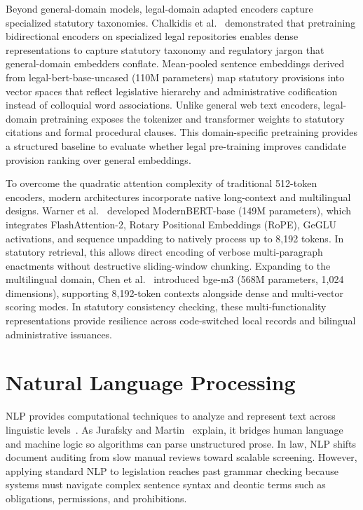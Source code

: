     Beyond general-domain models, legal-domain adapted encoders capture specialized statutory taxonomies. Chalkidis et al.~\cite{chalkidis2020legal} demonstrated that pretraining bidirectional encoders on specialized legal repositories enables dense representations to capture statutory taxonomy and regulatory jargon that general-domain embedders conflate. Mean-pooled sentence embeddings derived from legal-bert-base-uncased (110M parameters) map statutory provisions into vector spaces that reflect legislative hierarchy and administrative codification instead of colloquial word associations. Unlike general web text encoders, legal-domain pretraining exposes the tokenizer and transformer weights to statutory citations and formal procedural clauses. This domain-specific pretraining provides a structured baseline to evaluate whether legal pre-training improves candidate provision ranking over general embeddings.

    To overcome the quadratic attention complexity of traditional 512-token encoders, modern architectures incorporate native long-context and multilingual designs. Warner et al.~\cite{warner2024modernbert} developed ModernBERT-base (149M parameters), which integrates FlashAttention-2, Rotary Positional Embeddings (RoPE), GeGLU activations, and sequence unpadding to natively process up to 8,192 tokens. In statutory retrieval, this allows direct encoding of verbose multi-paragraph enactments without destructive sliding-window chunking. Expanding to the multilingual domain, Chen et al.~\cite{chen2024bgem3} introduced bge-m3 (568M parameters, 1,024 dimensions), supporting 8,192-token contexts alongside dense and multi-vector scoring modes. In statutory consistency checking, these multi-functionality representations provide resilience across code-switched local records and bilingual administrative issuances.

\section{Natural Language Processing}
NLP provides computational techniques to analyze and represent text across linguistic levels~\cite{liddy2001natural}. As Jurafsky and Martin~\cite{jurafsky2024speech} explain, it bridges human language and machine logic so algorithms can parse unstructured prose. In law, NLP shifts document auditing from slow manual reviews toward scalable screening. However, applying standard NLP to legislation reaches past grammar checking because systems must navigate complex sentence syntax and deontic terms such as obligations, permissions, and prohibitions.

